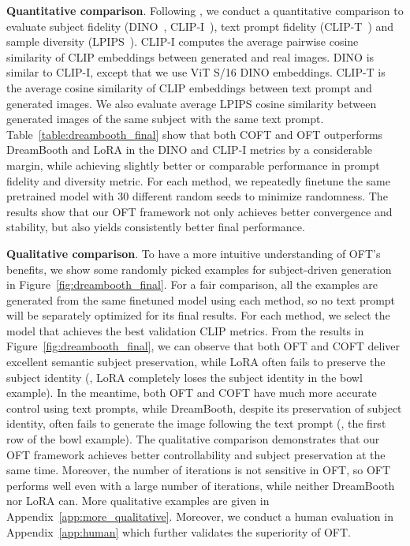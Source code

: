 \setlength{\columnsep}{11pt}




\textbf{Quantitative comparison}. Following \cite{ruiz2023dreambooth}, we conduct a quantitative comparison to evaluate subject fidelity (DINO~\cite{caron2021emerging}, CLIP-I~\cite{radford2021learning}), text prompt fidelity (CLIP-T~\cite{radford2021learning}) and sample diversity (LPIPS~\cite{zhang2018unreasonable}). CLIP-I computes the average pairwise cosine similarity of CLIP embeddings between generated and real images. DINO is similar to CLIP-I, except that we use ViT S/16 DINO embeddings. CLIP-T is the average cosine similarity of CLIP embeddings between text prompt and generated images. We also evaluate average LPIPS cosine similarity between generated images of the same subject with the same text prompt. Table~\ref{table:dreambooth_final} show that both COFT and OFT outperforms DreamBooth and LoRA in the DINO and CLIP-I metrics by a considerable margin, while achieving slightly better or comparable performance in prompt fidelity and diversity metric. For each method, we repeatedly finetune the same pretrained model with 30 different random seeds to minimize randomness. The results show that our OFT framework not only achieves better convergence and stability, but also yields consistently better final performance.




\textbf{Qualitative comparison}. To have a more intuitive understanding of OFT's benefits, we show some randomly picked examples for subject-driven generation in Figure~\ref{fig:dreambooth_final}. For a fair comparison, all the examples are generated from the same finetuned model using each method, so no text prompt will be separately optimized for its final results. For each method, we select the model that achieves the best validation CLIP metrics. From the results in Figure~\ref{fig:dreambooth_final}, we can observe that both OFT and COFT deliver excellent semantic subject preservation, while LoRA often fails to preserve the subject identity (\eg, LoRA completely loses the subject identity in the bowl example). In the meantime, both OFT and COFT have much more accurate control using text prompts, while DreamBooth, despite its preservation of subject identity, often fails to generate the image following the text prompt (\eg, the first row of the bowl example). The qualitative comparison demonstrates that our OFT framework achieves better controllability and subject preservation at the same time. Moreover, the number of iterations is not sensitive in OFT, so OFT performs well even with a large number of iterations, while neither DreamBooth nor LoRA can. More qualitative examples are given in Appendix~\ref{app:more_qualitative}. Moreover, we conduct a human evaluation in Appendix~\ref{app:human} which further validates the superiority of OFT.


